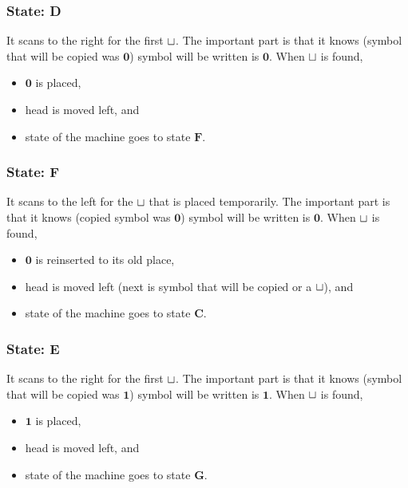 \subsubsection*{State: D}
\label{q2-state:D}

It scans to the right for the first $\sqcup$. The important part is that it knows (symbol that will be copied was $\mathbf{0}$) symbol will be written is $\mathbf{0}$. When $\sqcup$ is found,
\begin{itemize}
  \item $\mathbf{0}$ is placed,
  \item head is moved left, and
  \item state of the machine goes to state \hyperref[q2-state:F]{$\mathbf{F}$}.
\end{itemize}

\subsubsection*{State: F}
\label{q2-state:F}

It scans to the left for the $\sqcup$ that is placed temporarily. The important part is that it knows (copied symbol was $\mathbf{0}$) symbol will be written is $\mathbf{0}$. When $\sqcup$ is found,
\begin{itemize}
  \item $\mathbf{0}$ is reinserted to its old place,
  \item head is moved left (next is symbol that will be copied or a $\sqcup$), and
  \item state of the machine goes to state \hyperref[q2-state:C]{$\mathbf{C}$}.
\end{itemize}

\subsubsection*{State: E}
\label{q2-state:E}

It scans to the right for the first $\sqcup$. The important part is that it knows (symbol that will be copied was $\mathbf{1}$) symbol will be written is $\mathbf{1}$. When $\sqcup$ is found,
\begin{itemize}
  \item $\mathbf{1}$ is placed,
  \item head is moved left, and
  \item state of the machine goes to state \hyperref[q2-state:G]{$\mathbf{G}$}.
\end{itemize}

